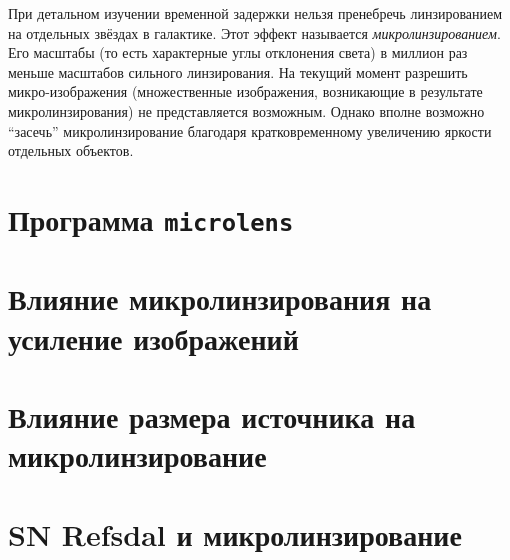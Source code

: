 При детальном изучении временной задержки нельзя пренебречь линзированием на отдельных звёздах в галактике. Этот эффект называется \textit{микролинзированием}. Его масштабы (то есть характерные углы отклонения света) в миллион раз меньше масштабов сильного линзирования. На текущий момент разрешить микро-изображения (множественные изображения, возникающие в результате микролинзирования) не представляется возможным. Однако вполне возможно “засечь” микролинзирование благодаря кратковременному увеличению яркости отдельных объектов. 

\section{Программа \tt{microlens}}
    
    
\section{Влияние микролинзирования на усиление изображений} %
    
    
\section{Влияние размера источника на микролинзирование}
    
    
\section{SN Refsdal и микролинзирование} \label{microrefsdal}
    